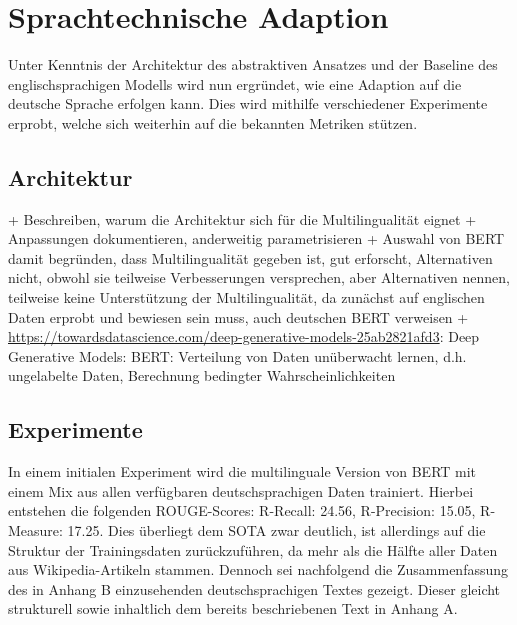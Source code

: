\chapter{Sprachtechnische Adaption}
\thispagestyle{fancy}
\label{chap:Sprachtechnische Adaption}

\noindent
Unter Kenntnis der Architektur des abstraktiven Ansatzes und der Baseline des englischsprachigen Modells wird nun ergründet, wie eine Adaption auf die deutsche Sprache erfolgen kann. Dies wird mithilfe verschiedener Experimente erprobt, welche sich weiterhin auf die bekannten Metriken stützen.\\


\section{Architektur}
\noindent
+ Beschreiben, warum die Architektur sich für die Multilingualität eignet
+ Anpassungen dokumentieren, anderweitig parametrisieren
+ Auswahl von BERT damit begründen, dass Multilingualität gegeben ist, gut erforscht, Alternativen nicht, obwohl sie teilweise Verbesserungen versprechen, aber Alternativen nennen, teilweise keine Unterstützung der Multilingualität, da zunächst auf englischen Daten erprobt und bewiesen sein muss,
auch deutschen BERT verweisen
+ \url{https://towardsdatascience.com/deep-generative-models-25ab2821afd3}: Deep Generative Models: BERT: Verteilung von Daten unüberwacht lernen, d.h. ungelabelte Daten, Berechnung bedingter Wahrscheinlichkeiten\\


\section{Experimente}
\noindent
In einem initialen Experiment wird die multilinguale Version von \ac{BERT} mit einem Mix aus allen verfügbaren deutschsprachigen Daten trainiert. Hierbei entstehen die folgenden \ac{ROUGE}-Scores: R-Recall: 24.56, R-Precision: 15.05, R-Measure: 17.25. Dies überliegt dem \ac{SOTA} zwar deutlich, ist allerdings auf die Struktur der Trainingsdaten zurückzuführen, da mehr als die Hälfte aller Daten aus Wikipedia-Artikeln stammen. Dennoch sei nachfolgend die Zusammenfassung des in Anhang B einzusehenden deutschsprachigen Textes gezeigt. Dieser gleicht strukturell sowie inhaltlich dem bereits beschriebenen Text in Anhang A.\\


